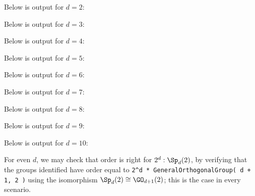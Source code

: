


% 

Below is output for $d = 2$:



Below is output for $d = 3$:



Below is output for $d = 4$:



Below is output for $d = 5$:



Below is output for $d = 6$:



Below is output for $d = 7$:



Below is output for $d = 8$:



Below is output for $d = 9$:



Below is output for $d = 10$:



For even $d$, we may check that order is right for $2^d : \Sp_d(2)$, by verifying that the groups identified have order equal to \texttt{2\^{}d * GeneralOrthogonalGroup( d + 1, 2 )} using the isomorphism $\Sp_d(2) \cong \GO_{d+1}(2)$; this is the case in every scenario.

% 